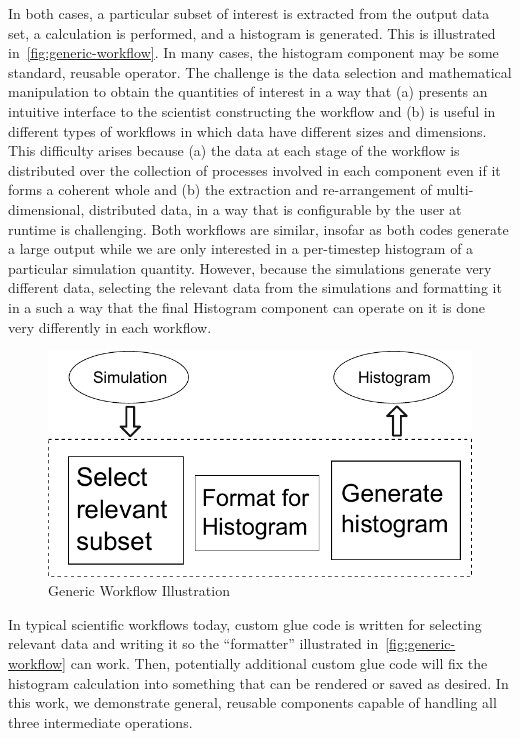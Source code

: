 In both cases, a particular subset of interest is extracted from the
output data set, a calculation is performed, and a histogram is
generated. This is illustrated in~\autoref{fig:generic-workflow}. In many
cases, the histogram component may be some standard, reusable operator.
The challenge is the data selection and mathematical
manipulation to obtain the quantities of interest in a way that (a) presents an
intuitive interface to the scientist constructing the workflow and (b) is
useful in different types of workflows in which data have different sizes and
dimensions.  This difficulty arises because (a) the data at each stage of the
workflow is distributed over the collection of processes involved in each
component even if it forms a coherent whole and (b) the extraction and
re-arrangement of multi-dimensional, distributed data, in a way that is
configurable by the user at runtime is challenging.  Both workflows are
similar, insofar as both codes generate a large output while we are only
interested in a per-timestep histogram of a particular simulation quantity.
However, because the simulations generate very different data, selecting the
relevant data from the simulations and formatting it in a such a way that the
final Histogram component can operate on it is done very differently in each
workflow.

\begin{figure}[htbp]
  \vspace{-0.1in}
  \centering
  \includegraphics[width=0.7\columnwidth]{fig/gwflow}
  \vspace{-0.09in}
  \caption{Generic Workflow Illustration}
  \label{fig:generic-workflow}
  \vspace{-0.10in}
\end{figure}

In typical scientific workflows today, custom glue code is written for
selecting relevant data and writing it so the ``formatter'' illustrated in~\autoref{fig:generic-workflow} can work.  Then, potentially additional
custom glue code will fix the histogram calculation into something that can be
rendered or saved as desired.  In this work, we demonstrate general, reusable
components capable of handling all three intermediate operations.

